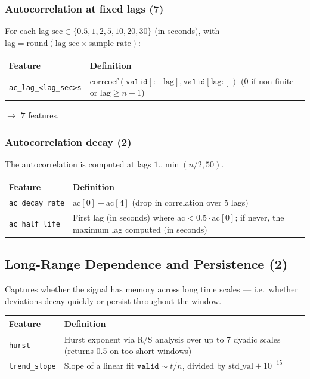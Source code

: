 \documentclass[11pt,a4paper]{article}
\begin{document}
\subsubsection*{Autocorrelation at fixed lags (7)}

For each $\mathrm{lag\_sec} \in \{0.5, 1, 2, 5, 10, 20, 30\}$ (in seconds),
with $\mathrm{lag} = \mathrm{round}(\mathrm{lag\_sec} \times \mathrm{sample\_rate})$:

\begin{tabular}{@{}lp{10cm}@{}}
\toprule
\textbf{Feature} & \textbf{Definition} \\
\midrule
\texttt{ac\_lag\_<lag\_sec>s} & $\mathrm{corrcoef}(\texttt{valid}[:-\mathrm{lag}], \texttt{valid}[\mathrm{lag}:])$ (0 if non-finite or $\mathrm{lag} \ge n - 1$) \\
\bottomrule
\end{tabular}

$\rightarrow$ $\mathbf{7}$ features.

\subsubsection*{Autocorrelation decay (2)}

The autocorrelation is computed at lags $1..\min(n/2, 50)$.

\begin{tabular}{@{}lp{10cm}@{}}
\toprule
\textbf{Feature} & \textbf{Definition} \\
\midrule
\texttt{ac\_decay\_rate} & $\mathrm{ac}[0] - \mathrm{ac}[4]$ (drop in correlation over 5 lags) \\
\texttt{ac\_half\_life}  & First lag (in seconds) where $\mathrm{ac} < 0.5 \cdot \mathrm{ac}[0]$; if never, the maximum lag computed (in seconds) \\
\bottomrule
\end{tabular}

\subsection{Long-Range Dependence and Persistence (2)}

Captures whether the signal has memory across long time scales --- i.e.\
whether deviations decay quickly or persist throughout the window.

\begin{tabular}{@{}lp{10cm}@{}}
\toprule
\textbf{Feature} & \textbf{Definition} \\
\midrule
\texttt{hurst}        & Hurst exponent via R/S analysis over up to 7 dyadic scales (returns 0.5 on too-short windows) \\
\texttt{trend\_slope} & Slope of a linear fit $\texttt{valid} \sim t/n$, divided by $\mathrm{std\_val} + 10^{-15}$ \\
\bottomrule
\end{tabular}
\end{document}
